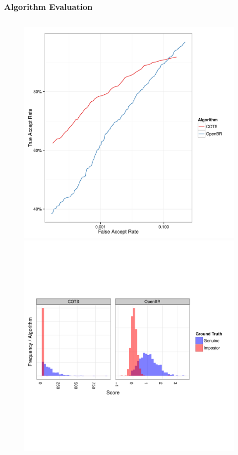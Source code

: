 \documentclass[12pt]{beamer}
\begin{document}
\begin{frame}
\frametitle{Algorithm Evaluation}
\begin{figure}
\begin{columns}
    \includegraphics[width=\textwidth]{img/MEDS/MEDS_ROC}
    \includegraphics[width=\textwidth]{img/MEDS/MEDS_SD}

\end{columns}
\end{figure}
\end{frame}
\end{document}
